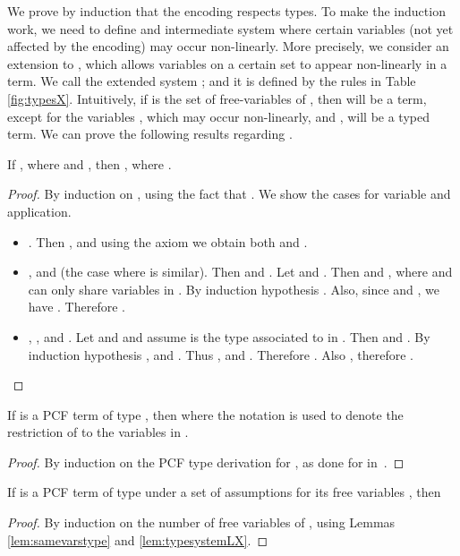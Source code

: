 \documentclass{article}
\begin{document}
We prove by induction that the encoding respects types. To make the
induction work, we need to define and intermediate system where certain
variables (not yet affected by the encoding) may occur non-linearly.
More precisely, we consider an extension to
\LLCIrec, which allows variables on a certain set  to appear
non-linearly in a term. We call the extended system \LLCIrecX; and it is
defined by the rules in Table \ref{fig:typesX}. Intuitively, if  is
the set of free-variables of , then  will be a \LLCIrec
term, except for the variables , which may occur non-linearly,
and , will be a typed \LLCIrec term.
We can prove the following results regarding \LLCIrecX.

\begin{lemma}\label{lem:samevarstype}
If , where  and
, then ,
where .
\end{lemma}
\begin{proof}
By induction on , using the fact that .
We show the cases for variable and application.
\begin{itemize}
\item . Then , and using the axiom we obtain both
    and .
\item , and  (the case where
  is similar).
Then  and .
Let  and . Then
 and  , where  and  can only
share variables in .
By induction hypothesis .
Also, since  and , we have
.
Therefore   .
\item , , and .
Let  and
 and
assume  is the type associated to  in . Then
 and
  .
By induction  hypothesis , and .
Thus , and
  .
Therefore   .
Also ,
therefore .
\end{itemize}
\end{proof}
\begin{lemma}\label{lem:typesystemLX}
If  is a PCF term of type , then  where the notation
 is used to denote the restriction of 
 to the variables in .
 \end{lemma}

\begin{proof}
By induction on the PCF type derivation for , as done for \ST in~\cite{AlvesS:TCS}.


\end{proof}
\begin{theorem}If  is a PCF term of type  under a set of
assumptions  for its free variables , then

\end{theorem}
\begin{proof}
By induction on the number of free variables of , using Lemmas~
\ref{lem:samevarstype} and \ref{lem:typesystemLX}.
\end{proof}
\end{document}

